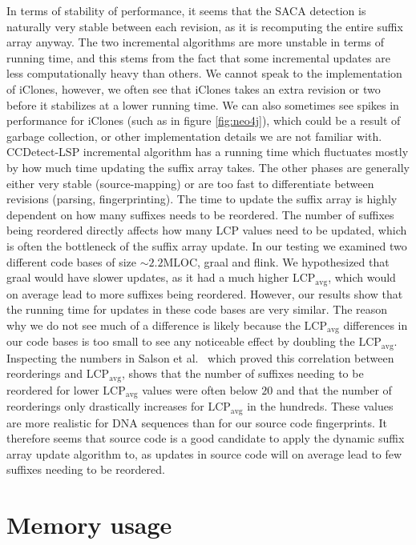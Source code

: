In terms of stability of performance, it seems that the SACA detection is naturally very
stable between each revision, as it is recomputing the entire suffix array anyway. The two
incremental algorithms are more unstable in terms of running time, and this stems from the
fact that some incremental updates are less computationally heavy than others. We cannot
speak to the implementation of iClones, however, we often see that iClones takes an extra
revision or two before it stabilizes at a lower running time. We can also sometimes see
spikes in performance for iClones (such as in figure \ref{fig:neo4j}), which could be a
result of garbage collection, or other implementation details we are not familiar with.
CCDetect-LSP incremental algorithm has a running time which fluctuates mostly by how much
time updating the suffix array takes. The other phases are generally either very stable
(source-mapping) or are too fast to differentiate between revisions (parsing,
fingerprinting). The time to update the suffix array is highly dependent on how many
suffixes needs to be reordered. The number of suffixes being reordered directly affects
how many LCP values need to be updated, which is often the bottleneck of the suffix array
update. In our testing we examined two different code bases of size
${\sim}2.2\text{MLOC}$, graal and flink. We hypothesized that graal would have slower
updates, as it had a much higher $\text{LCP}_\text{avg}$, which would on average lead to
more suffixes being reordered. However, our results show that the running time for updates
in these code bases are very similar. The reason why we do not see much of a difference is
likely because the $\text{LCP}_\text{avg}$ differences in our code bases is too small to
see any noticeable effect by doubling the $\text{LCP}_\text{avg}$. Inspecting the numbers
in Salson et al.~\cite{DynamicExtendedSuffixArraysReorderings} which proved this
correlation between reorderings and $\text{LCP}_\text{avg}$, shows that the number of suffixes
needing to be reordered for lower $\text{LCP}_\text{avg}$ values were often below $20$ and
that the number of reorderings only drastically increases for $\text{LCP}_\text{avg}$ in
the hundreds. These values are more realistic for DNA sequences than for our source code
fingerprints. It therefore seems that source code is a good candidate to apply the dynamic
suffix array update algorithm to, as updates in source code will on average lead to few
suffixes needing to be reordered.

\section{Memory usage}

